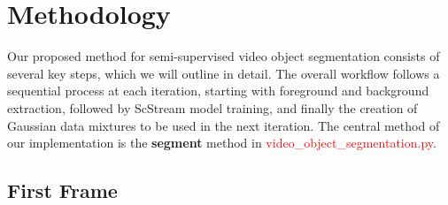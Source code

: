 \documentclass[12pt]{article}
\begin{document}
\section{Methodology}\label{sec:methodology}
Our proposed method for semi-supervised video object segmentation consists of several key steps, which we will outline in detail.
The overall workflow follows a sequential process at each iteration, starting with foreground and background extraction,
followed by ScStream model training, and finally the creation of Gaussian data mixtures to be used in the next iteration.
The central method of our implementation is the \textbf{segment} method in \textcolor{red}{video\_object\_segmentation.py}.
\subsection{First Frame}\label{subsec:first-frame}
\end{document}
